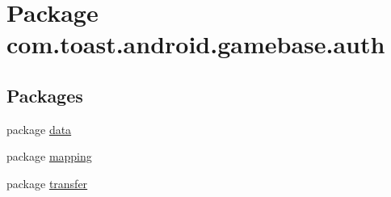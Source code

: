 \hypertarget{namespacecom_1_1toast_1_1android_1_1gamebase_1_1auth}{}\section{Package com.\+toast.\+android.\+gamebase.\+auth}
\label{namespacecom_1_1toast_1_1android_1_1gamebase_1_1auth}
\subsection*{Packages}
\begin{DoxyCompactItemize}
\item 
package \hyperlink{namespacecom_1_1toast_1_1android_1_1gamebase_1_1auth_1_1data}{data}
\item 
package \hyperlink{namespacecom_1_1toast_1_1android_1_1gamebase_1_1auth_1_1mapping}{mapping}
\item 
package \hyperlink{namespacecom_1_1toast_1_1android_1_1gamebase_1_1auth_1_1transfer}{transfer}
\end{DoxyCompactItemize}
